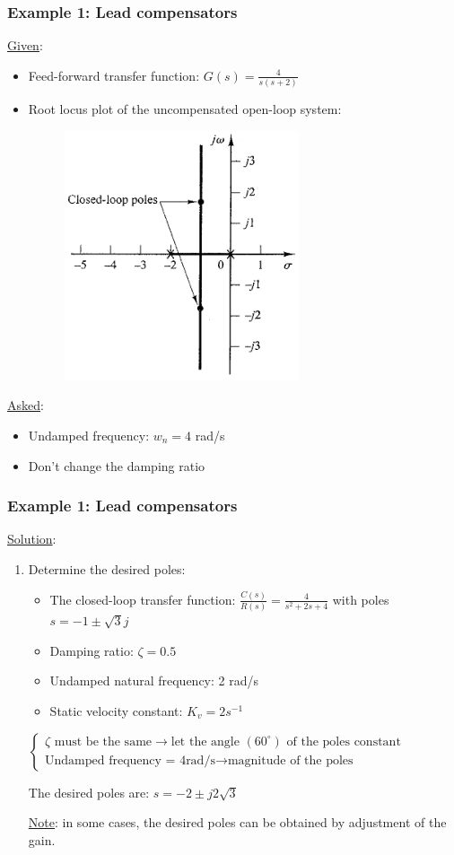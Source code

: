 \begin{frame}
	\frametitle{Example 1: Lead compensators}
	\underline{Given}:
	\begin{itemize}
		\item Feed-forward transfer function: $G(s)=\frac{4}{s(s+2)}$
		\item Root locus plot of the uncompensated open-loop system:
		\begin{figure}
			\centering
			\includegraphics[width=0.3\linewidth]{Ex1_rootlocus}
		\end{figure}
	\end{itemize}
	\underline{Asked}:
	\begin{itemize}
		\item Undamped frequency: $w_n=4$ rad/s
		\item Don't change the damping ratio
	\end{itemize}
\end{frame}

\begin{frame}
	\frametitle{Example 1: Lead compensators}
	\underline{Solution}:
	\begin{enumerate}
		\item Determine the desired poles: 
		\begin{itemize}
			\item The closed-loop transfer function: $\frac{C(s)}{R(s)}=\frac{4}{s^2+2s+4}$ with poles $s=-1\pm\sqrt{3}j$
			\item Damping ratio: $\zeta=0.5$
			\item Undamped natural frequency: 2 rad/s
			\item Static velocity constant: $K_v=2s^{-1}$
		\end{itemize}
		\vspace{3mm}
		$\begin{cases}
			\zeta \text{ must be the same} \rightarrow \text{let the angle } (60^{\circ}) \text{ of the poles constant}\\
			\text{Undamped frequency = 4rad/s} \rightarrow \text{magnitude of the poles}
		\end{cases}$
		\vspace{1mm}
		
		The desired poles are: $s=-2\pm j2\sqrt{3}$
		\vspace{3mm}
		
		\underline{Note}: in some cases, the desired poles can be obtained by adjustment of the gain. 
	\end{enumerate}
\end{frame}

